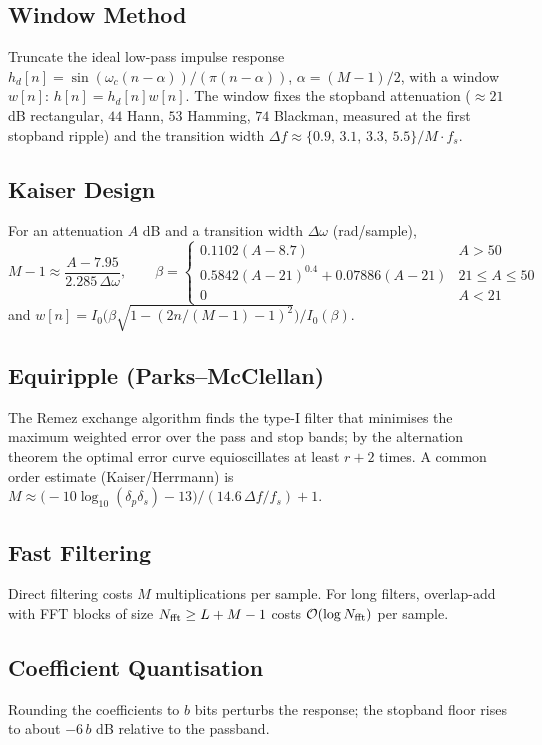 \documentclass[11pt,a4paper]{article}
\begin{document}
\subsection{Window Method}
Truncate the ideal low-pass impulse response $h_d[n]=\sin(\omega_c(n-\alpha))/(\pi(n-\alpha))$, $\alpha=(M-1)/2$, with a window $w[n]$: $h[n]=h_d[n]w[n]$. The window fixes the stopband attenuation ($\approx21$ dB rectangular, $44$ Hann, $53$ Hamming, $74$ Blackman, measured at the first stopband ripple) and the transition width $\Delta f\approx\{0.9,\,3.1,\,3.3,\,5.5\}/M\cdot f_s$.

\subsection{Kaiser Design}
For an attenuation $A$ dB and a transition width $\Delta\omega$ (rad/sample),
\begin{equation}
  M-1\approx\frac{A-7.95}{2.285\,\Delta\omega},\qquad
  \beta=\begin{cases}0.1102(A-8.7)&A>50\\0.5842(A-21)^{0.4}+0.07886(A-21)&21\le A\le50\\0&A<21\end{cases}
  \label{eq:kaiser}
\end{equation}
and $w[n]=I_0\!\big(\beta\sqrt{1-(2n/(M-1)-1)^2}\big)/I_0(\beta)$.

\subsection{Equiripple (Parks--McClellan)}
The Remez exchange algorithm finds the type-I filter that minimises the maximum weighted error over the pass and stop bands; by the alternation theorem the optimal error curve equioscillates at least $r+2$ times. A common order estimate (Kaiser/Herrmann) is $M\approx\big(-10\log_{10}(\delta_p\delta_s)-13\big)/(14.6\,\Delta f/f_s)+1$.

\subsection{Fast Filtering}
Direct filtering costs $M$ multiplications per sample. For long filters, overlap-add with FFT blocks of size $N_{\rm fft}\ge L+M-1$ costs $\mathcal O(\log N_{\rm fft})$ per sample.

\subsection{Coefficient Quantisation}
Rounding the coefficients to $b$ bits perturbs the response; the stopband floor rises to about $-6\,b$ dB relative to the passband.
\end{document}
